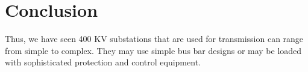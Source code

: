 \documentclass[11pt, a4paper]{article} %
\begin{document}
\section{Conclusion}

Thus, we have seen 400 KV substations that are used for transmission can range from simple to complex. They may use simple bus bar designs or may be loaded with sophisticated protection and control equipment. 

\newpage %

%




\end{document}
